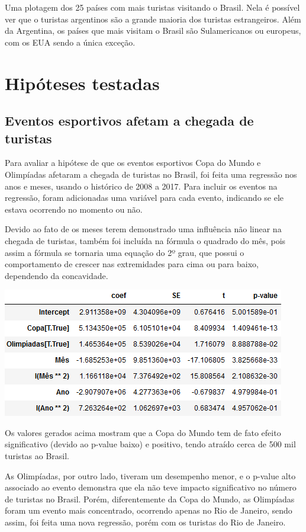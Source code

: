 \documentclass[review]{elsarticle}
\begin{document}
Uma plotagem dos 25 países com mais turistas visitando o Brasil. Nela é possível ver que o turistas argentinos são a grande maioria dos turistas estrangeiros. Além da Argentina, os países que mais visitam o Brasil são Sulamericanos ou europeus, com os EUA sendo a única exceção.

\section{Hipóteses testadas}
\subsection{Eventos esportivos afetam a chegada de turistas}
Para avaliar a hipótese de que os eventos esportivos Copa do Mundo e Olimpíadas afetaram a chegada de turistas no Brasil, foi feita uma regressão nos anos e meses, usando o histórico de 2008 a 2017. Para incluir os eventos na regressão, foram adicionadas uma variável para cada evento, indicando se ele estava ocorrendo no momento ou não.

Devido ao fato de os meses terem demonstrado uma influência não linear na chegada de turistas, também foi incluída na fórmula o quadrado do mês, pois assim a fórmula se tornaria uma equação do 2º grau, que possui o comportamento de crescer nas extremidades para cima ou para baixo, dependendo da concavidade.

\includegraphics[width=\textwidth]{Regression-BR}

Os valores gerados acima mostram que a Copa do Mundo tem de fato efeito significativo (devido ao p-value baixo) e positivo, tendo atraído cerca de 500 mil turistas ao Brasil.

As Olimpíadas, por outro lado, tiveram um desempenho menor, e o p-value alto associado ao evento demonstra que ela não teve impacto significativo no número de turistas no Brasil. Porém, diferentemente da Copa do Mundo, as Olimpíadas foram um evento mais concentrado, ocorrendo apenas no Rio de Janeiro, sendo assim, foi feita uma nova regressão, porém com os turistas do Rio de Janeiro.
\end{document}

